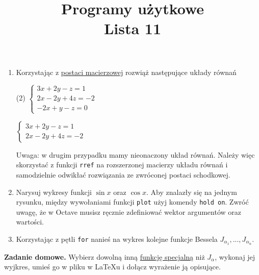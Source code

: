 \documentclass[12pt, letterpaper]{article}
\title{Programy użytkowe \\ Lista 11}
\date{}
\begin{document}
\maketitle
\begin{enumerate}
\item Korzystając z \href{https://pl.wikipedia.org/wiki/Uk%C5%82ad_r%C3%B3wna%C5%84_liniowych#Posta%C4%87_i_zapis}{postaci macierzowej} rozwiąż następujące układy równań
\begin{tasks}[label=\alph*)](2)
\task 
$
\begin{cases}
3x+2y-z=1\\
2x-2y+4z=-2\\
-2x+y-z=0
\end{cases}
\quad$

\task 
$\begin{cases}
3x+2y-z=1\\
2x-2y+4z=-2
\end{cases}$
\end{tasks}
Uwaga: w drugim przypadku mamy nieonaczony układ równań. Należy więc skorzystać z funkcji \verb|rref| na rozszerzonej macierzy układu równań i samodzielnie odwikłać rozwiązania ze zwróconej postaci schodkowej.
\item Narysuj wykresy funkcji $\sin{x}$ oraz $\cos{x}$. Aby znalazły się na jednym rysunku, między wywołaniami funkcji \verb|plot| użyj komendy \verb|hold on|. Zwróć uwagę, że w Octave musisz ręcznie zdefiniować wektor argumentów oraz wartości.
\item Korzystając z pętli \verb|for| nanieś na wykres kolejne funkcje Bessela $J_{\alpha_1},...,J_{\alpha_n}$.
\end{enumerate}
\textbf{Zadanie domowe.} Wybierz dowolną inną \href{https://docs.octave.org/v4.4.0/Special-Functions.html}{funkcję specjalną} niż $J_\alpha$, wykonaj jej wyjkres, umieś go w pliku w \LaTeX{u} i dołącz wyrażenie ją opisujące.
\end{document}
